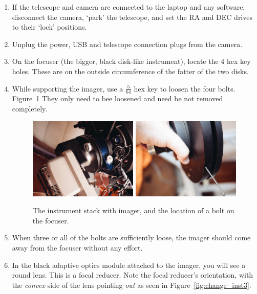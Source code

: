 \documentclass[12pt,twoside,a4paper]{report}
\begin{document}
\begin{enumerate}
 \item If the telescope and camera are connected to the laptop and any software, disconnect the camera, `park' the telescope, and set the RA and DEC drives to their `lock' positions.
 \item Unplug the power, USB and telescope connection plugs from the camera.
 \item On the focuser (the bigger, black disk-like instrument), locate the 4 hex key holes. These are on the outside circumference of the fatter of the two disks.
 \item While supporting the imager, use a $\frac{5}{64}$ hex key to loosen the four bolts. Figure~\ref{fig:change_inst1} They only need to bee loosened and need be not removed completely.

\begin{figure}[ht]
  \centering
    \includegraphics[width=0.49\textwidth]{documentation_images/change_inst1.jpg}
    \includegraphics[width=0.49\textwidth]{documentation_images/change_inst2.jpg}
    \caption{\label{fig:change_inst1} The instrument stack with imager, and the location of a bolt on the focuser.}
 \end{figure}

 \item When three or all of the bolts are sufficiently loose, the imager should come away from the focuser without any effort.
 \item In the black adaptive optics module attached to the imager, you will see a round lens. This is a focal reducer. Note the focal reducer's orientation, with the \emph{convex} side of the lens pointing \emph{out} as seen in Figure~\ref{fig:change_inst3}.


\end{enumerate}
\end{document}

